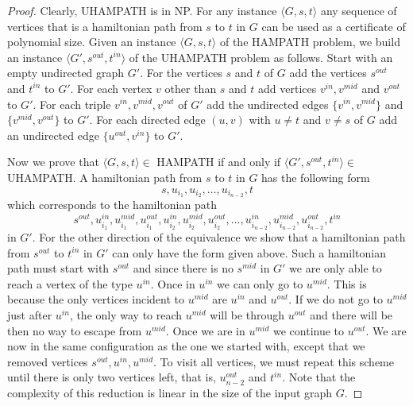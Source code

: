 \documentclass{article}
\begin{document}
\begin{proof}
	Clearly, UHAMPATH is in NP. For any instance \(\langle G,s,t\rangle\)
	any sequence of vertices that is a
	hamiltonian path from \(s\) to \(t\) in \(G\) can be used as a certificate
	of polynomial size.
	Given an instance \(\langle G, s, t \rangle\) of the HAMPATH problem, we
	build an instance \(\langle G', s^{out}, t^{in}\rangle\) of the UHAMPATH
	problem as follows. Start with an empty undirected graph \(G'\). For the
	vertices \(s\) and \(t\) of \(G\) add the vertices \(s^{out}\) and
	\(t^{in}\) to \(G'\). For each vertex \(v\) other than \(s\) and \(t\) add
	vertices \(v^{in}, v^{mid}\) and \(v^{out}\) to \(G'\). For each triple
	\(v^{in},v^{mid},v^{out}\) of \(G'\) add the undirected edges \(\{v^{in},
	v^{mid}\}\) and \(\{v^{mid},v^{out}\}\) to \(G'\).
	For each directed
	edge \((u,v)\) with \(u \neq t\) and \(v \neq s\) of \(G\) add an
	undirected
	edge \(\{u^{out},v^{in}\}\) to \(G'\).

	Now we prove that \(\langle G, s, t \rangle \in\) HAMPATH if and only if
	\(\langle G', s^{out}, t^{in}\rangle \in\) UHAMPATH. A hamiltonian path from \(s\) to
	\(t\) in \(G\) has the following form
	\begin{displaymath}
		s, u_{i_1}, u_{i_2}, \ldots, u_{i_{n-2}}, t
	\end{displaymath}
	which corresponds to the hamiltonian path
	\begin{displaymath}
		s^{out}, u^{in}_{i_1}, u^{mid}_{i_1}, u^{out}_{i_1}, u^{in}_{i_2},
		u^{mid}_{i_2}, u^{out}_{i_2}, \ldots, u^{in}_{i_{n-2}}, u^{mid}_{i_{n-2}},
		u^{out}_{i_{n-2}}, t^{in}
	\end{displaymath}
	in \(G'\). For the other direction of the equivalence we show that a
	hamiltonian path from \(s^{out}\) to \(t^{in}\) in \(G'\) can only have the
	form given above. Such a hamiltonian path must start with \(s^{out}\) and
	since there is no \(s^{mid}\) in \(G'\) we are only able to reach a vertex
	of the type \(u^{in}\). Once in \(u^{in}\) we can only go to \(u^{mid}\).
	This is because the only vertices incident to \(u^{mid}\) are \(u^{in}\) and
	\(u^{out}\). If we do not go to \(u^{mid}\) just after \(u^{in}\),
	the only way to reach \(u^{mid}\) will be through \(u^{out}\) and there
	will be then no way to escape from \(u^{mid}\). Once we are in \(u^{mid}\)
	we continue to \(u^{out}\). We are now in the same configuration as the one
	we started with, except that we removed vertices
	\(s^{out},u^{in},u^{mid}\). To visit all vertices, we must repeat this
	scheme until there is only two vertices left, that is, \(u^{out}_{n-2}\)
	and \(t^{in}\). Note that the complexity of this reduction is linear in the
	size of the input graph \(G\).
\end{proof}
\end{document}
